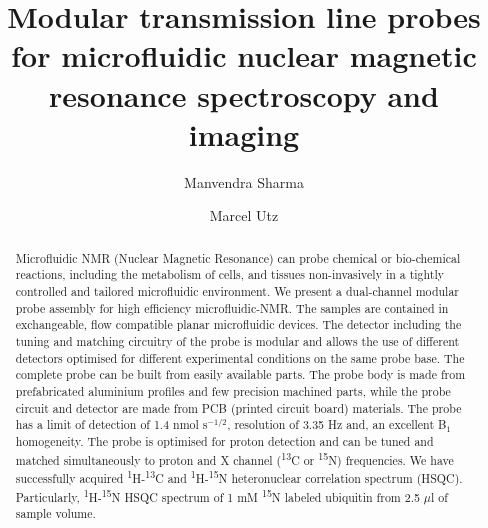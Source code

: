 \documentclass[preprint,5p]{elsarticle}
\begin{document}
\title{Modular transmission line probes for microfluidic nuclear magnetic resonance spectroscopy and imaging}
\author[1]{Manvendra Sharma}
\author[1]{Marcel Utz}
\address[1]{School of Chemistry, University of Southampton, Southampton SO17 1BJ, United Kingdom}
\begin{abstract}
Microfluidic NMR (Nuclear Magnetic Resonance) can probe chemical or bio-chemical reactions, including the metabolism of cells, and tissues non-invasively in a tightly controlled and tailored microfluidic environment. We present a dual-channel modular probe assembly for  high efficiency microfluidic-NMR. The samples are contained in exchangeable, flow compatible planar microfluidic devices. The detector including the tuning and matching circuitry of the probe is modular and allows the use of different detectors optimised for different experimental conditions on the same probe base. The complete probe can be built from easily available parts. The probe body is made from prefabricated aluminium profiles and few precision machined parts, while the probe circuit and detector are made from PCB (printed circuit board) materials. The probe has a limit of detection of 1.4 nmol s$^{-1/2}$, resolution of 3.35 Hz and, an excellent B$_{1}$ homogeneity. The probe is optimised for proton detection and can be tuned and matched simultaneously to proton and X channel (\textsuperscript{13}C or \textsuperscript{15}N) frequencies. We have successfully acquired \textsuperscript{1}H-\textsuperscript{13}C and \textsuperscript{1}H-\textsuperscript{15}N heteronuclear correlation spectrum (HSQC). Particularly, \textsuperscript{1}H-\textsuperscript{15}N HSQC spectrum of 1 mM \textsuperscript{15}N labeled ubiquitin from 2.5 $\mu$l of sample volume.
\end{abstract}
\maketitle
\end{document}
